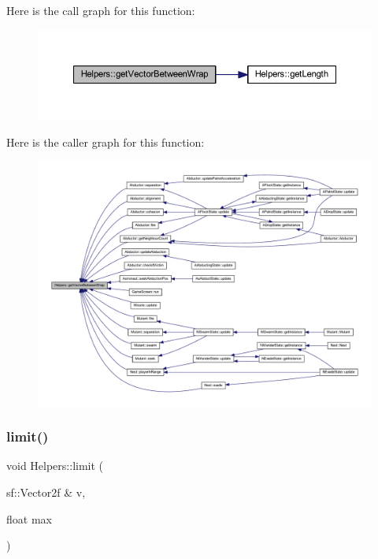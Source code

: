 Here is the call graph for this function\+:
\nopagebreak
\begin{figure}[H]
\begin{center}
\leavevmode
\includegraphics[width=350pt]{namespace_helpers_a93defc4f62a0b29303b84ea17eeeb2fb_cgraph}
\end{center}
\end{figure}
Here is the caller graph for this function\+:
\nopagebreak
\begin{figure}[H]
\begin{center}
\leavevmode
\includegraphics[width=350pt]{namespace_helpers_a93defc4f62a0b29303b84ea17eeeb2fb_icgraph}
\end{center}
\end{figure}
\mbox{\label{namespace_helpers_a7b90b08e0cd27e52500271b582f8797b}} 
\subsubsection{\texorpdfstring{limit()}{limit()}}
{\footnotesize\ttfamily void Helpers\+::limit (\begin{DoxyParamCaption}\item[{sf\+::\+Vector2f \&}]{v,  }\item[{float}]{max }\end{DoxyParamCaption})\hspace{0.3cm}{\ttfamily [inline]}}

